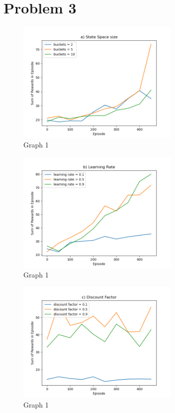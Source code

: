 \documentclass{article}
\begin{document}
\section{Problem 3}
\begin{figure}[h!]
    \centering
    \includegraphics[width=0.7\textwidth]{graph a.png}
    \caption{Graph 1}
\end{figure}
\begin{figure}[h!]
    \centering
    \includegraphics[width=0.7\textwidth]{graph b.png}
    \caption{Graph 1}
\end{figure}
\begin{figure}[h!]
    \centering
    \includegraphics[width=0.7\textwidth]{graph c.png}
    \caption{Graph 1}
\end{figure}
\end{document}
